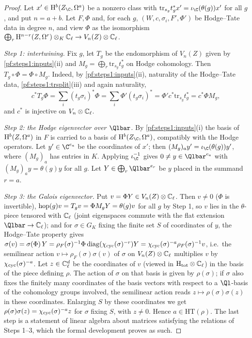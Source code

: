 \begin{proof}
Let $x'\in\stepsIH^b(Z_\C,\Omega^a)$ be a nonzero class with $\mathrm{tr}_{s_g}t_g^*x'=\iota_{\C}(\theta(g))x'$ for all $g$, and
put $n=a+b$. Let $F,\Phi$ and, for each $g$, $(W,c,\sigma_i,F',\Phi')$ be Hodge--Tate data in degree $n$, and view
$\Phi$ as the isomorphism $\bigoplus_r\mathrm{H}^{n-r}(Z,\Omega^r)\otimes_K\mathbb{C}_\ell\to V_n(Z)\otimes\mathbb{C}_\ell$.

\emph{Step 1: intertwining.} Fix $g$, let $T_g$ be the endomorphism of $V_n(Z)$ given by
\cref{pf:steps1:inputs}(ii) and $M_g=\bigoplus_r\mathrm{tr}_{s_g}t_g^*$ on Hodge cohomology. Then
$T_g\circ\Phi=\Phi\circ M_g$. Indeed, by \cref{pf:steps1:inputs}(ii), naturality of the Hodge--Tate data,
\cref{pf:steps1:trsplit}(iii) and again naturality,
\[
 c^*T_g\Phi=\sum_i(t_g\sigma_i)^*\Phi=\sum_i\Phi'(t_g\sigma_i)^*=\Phi'c^*\mathrm{tr}_{s_g}t_g^*=c^*\Phi M_g ,
\]
and $c^*$ is injective on $V_n\otimes\mathbb{C}_\ell$.

\emph{Step 2: the Hodge eigenvector over $\Qlbar$.} By \cref{pf:steps1:inputs}(i) the basis of
$\mathrm{H}^b(Z,\Omega^a)$ in $F$ is carried to a basis of $\stepsIH^b(Z_\C,\Omega^a)$, compatibly with the Hodge
operators. Let $y'\in\C^{e_a}$ be the coordinates of $x'$; then $(M_g)_ay'=\iota_{\C}(\theta(g))y'$, where $(M_g)_a$
has entries in $K$. Applying $\iota_{\C}^{-1}$ gives $0\ne y\in\Qlbar^{e_a}$ with $(M_g)_ay=\theta(g)y$ for all $g$.
Let $Y\in\bigoplus_r\Qlbar^{e_r}$ be $y$ placed in the summand $r=a$.

\emph{Step 3: the Galois eigenvector.} Put $v=\Phi Y\in V_n(Z)\otimes\mathbb{C}_\ell$. Then $v\ne0$ ($\Phi$ is invertible),
$\mathrm{hop}(g)v=T_gv=\Phi M_gY=\theta(g)v$ for all $g$ by Step 1, so $v$ lies in the $\theta$-piece tensored with
$\mathbb{C}_\ell$ (joint eigenspaces commute with the flat extension $\Qlbar\to\stepsICl$); and for $\sigma\in G_K$ fixing the
finite set $S$ of coordinates of $y$, the Hodge--Tate property gives
$\sigma(v)=\sigma(\Phi)\,Y=\rho_F(\sigma)^{-1}\Phi\,\mathrm{diag}(\chi_{\mathrm{cyc}}(\sigma)^{-r})Y=\chi_{\mathrm{cyc}}(\sigma)^{-a}\rho_F(\sigma)^{-1}v$,
i.e.\ the semilinear action $v\mapsto\rho_F(\sigma)\sigma(v)$ of $\sigma$ on $V_n(Z)\otimes\mathbb{C}_\ell$ multiplies $v$ by
$\chi_{\mathrm{cyc}}(\sigma)^{-a}$. Let $z\in\mathbb{C}_\ell^{d}$ be the coordinates of $v$ (viewed in $\mathrm{H}_{\mathrm{tot}}\otimes\mathbb{C}_\ell$) in the basis of
the piece defining $\rho$. The action of $\sigma$ on that basis is given by $\rho(\sigma)$; if $\sigma$ also fixes the finitely many
coordinates of the basis vectors with respect to a $\Ql$-basis of the cohomology groups involved, the semilinear action reads
$z\mapsto\rho(\sigma)\sigma(z)$ in these coordinates. Enlarging $S$ by these coordinates we get $\rho(\sigma)\sigma(z)
=\chi_{\mathrm{cyc}}(\sigma)^{-a}z$ for $\sigma$ fixing $S$, with $z\ne0$. Hence $a\in\mathrm{HT}(\rho)$. The last step is a statement of
linear algebra about matrices satisfying the relations of Steps 1--3, which the formal development proves as such.
\end{proof}

